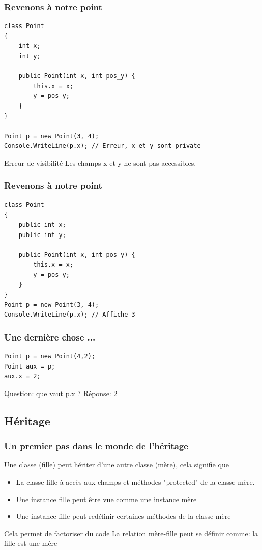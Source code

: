 \documentclass{beamer}
\begin{document}
\begin{frame}[fragile]
\frametitle{Revenons à notre point}
\begin{lstlisting}
class Point
{
    int x;
    int y;

    public Point(int x, int pos_y) {
        this.x = x;
        y = pos_y;
    }
}

Point p = new Point(3, 4);
Console.WriteLine(p.x); // Erreur, x et y sont private
\end{lstlisting}
\begin{alertblock}{Erreur de visibilité}
Les champs x et y ne sont pas accessibles.
\end{alertblock}
\end{frame}

\begin{frame}[fragile]
\frametitle{Revenons à notre point}
\begin{lstlisting}
class Point
{
    public int x;
    public int y;
    
    public Point(int x, int pos_y) {
        this.x = x;
        y = pos_y;
    }
}
Point p = new Point(3, 4);
Console.WriteLine(p.x); // Affiche 3
\end{lstlisting}
\end{frame}

\begin{frame}[fragile]
\frametitle{Une dernière chose ...}
\begin{lstlisting}
Point p = new Point(4,2);
Point aux = p;
aux.x = 2;
\end{lstlisting}
Question: que vaut p.x ? 
\pause
Réponse: 2
\end{frame}

\subsection{Héritage}
\begin{frame}
\frametitle{Un premier pas dans le monde de l'héritage}
Une classe (fille) peut hériter d'une autre classe (mère), cela signifie que
\begin{itemize}
\item La classe fille à accès aux champs et méthodes "protected" de la classe mère.
\item Une instance fille peut être vue comme une instance mère
\item Une instance fille peut redéfinir certaines méthodes de la classe mère
\end{itemize}
\pause
Cela permet de factoriser du code
\pause
La relation mère-fille peut se définir comme: la fille est-une mère
\end{frame}
\end{document}
